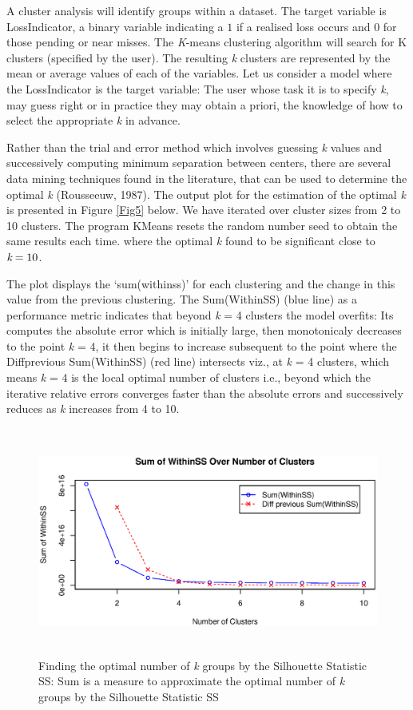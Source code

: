 \documentclass[]{DissertateUSU}
\begin{document}
A cluster analysis will identify groups within a dataset. The target
variable is LossIndicator, a binary variable indicating a \(1\) if a
realised loss occurs and \(0\) for those pending or near misses. The
\emph{K}-means clustering algorithm will search for K clusters
(specified by the user). The resulting \emph{k} clusters are represented
by the mean or average values of each of the variables. Let us consider
a model where the LossIndicator is the target variable: The user whose
task it is to specify \emph{k}, may guess right or in practice they may
obtain a priori, the knowledge of how to select the appropriate \emph{k}
in advance.\medskip

Rather than the trial and error method which involves guessing \emph{k}
values and successively computing minimum separation between centers,
there are several data mining techniques found in the literature, that
can be used to determine the optimal \emph{k} (Rousseeuw, 1987). The
output plot for the estimation of the optimal \emph{k} is presented in
Figure \ref{Fig5} below. We have iterated over cluster sizes from 2 to
10 clusters. The program KMeans resets the random number seed to obtain
the same results each time. where the optimal \emph{k} found to be
significant close to \(\emph{k} = 10\).\medskip

The plot displays the `sum(withinss)' for each clustering and the change
in this value from the previous clustering. The Sum(WithinSS) (blue
line) as a performance metric indicates that beyond \emph{k} = 4
clusters the model overfits: Its computes the absolute error which is
initially large, then monotonicaly decreases to the point \emph{k} = 4,
it then begins to increase subsequent to the point where the
Diffprevious Sum(WithinSS) (red line) intersects viz., at \emph{k} = 4
clusters, which means \emph{k} = 4 is the local optimal number of
clusters i.e., beyond which the iterative relative errors converges
faster than the absolute errors and successively reduces as \emph{k}
increases from 4 to 10.

\begin{figure}
\centering
\includegraphics[width=15cm, height=7.5cm]{IterateKmeans.eps}
\caption{Finding the optimal number of \emph{k} groups by the Silhouette Statistic SS: Sum is a  measure to approximate the optimal number of \emph{k} groups by the Silhouette Statistic SS}
\label{IterateKmeans}
\end{figure}
\end{document}
